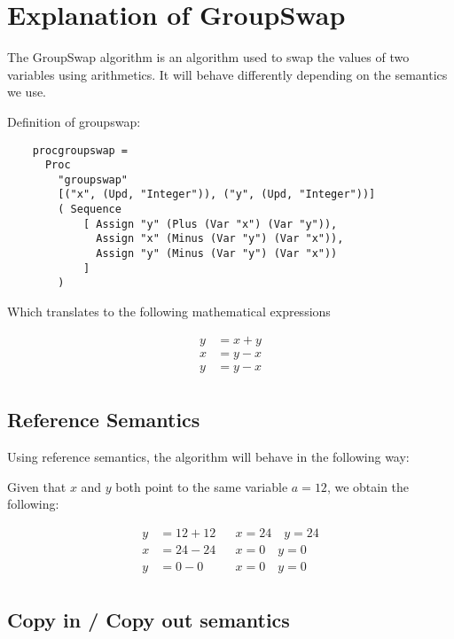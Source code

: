 \documentclass{article}
\begin{document}
    \section{Explanation of GroupSwap}

    The GroupSwap algorithm is an algorithm used to swap the values of two variables using arithmetics. It will behave differently depending on the semantics we use. 


    \begin{definition}
        Definition of groupswap: 
        \begin{lstlisting}
    procgroupswap =
      Proc
        "groupswap"
        [("x", (Upd, "Integer")), ("y", (Upd, "Integer"))]
        ( Sequence
            [ Assign "y" (Plus (Var "x") (Var "y")),
              Assign "x" (Minus (Var "y") (Var "x")),
              Assign "y" (Minus (Var "y") (Var "x"))
            ]
        )
        \end{lstlisting}

        Which translates to the following mathematical expressions

        \begin{align*}
            y &= x + y \\
            x &= y - x \\
            y &= y - x \\
        \end{align*}
    \end{definition}

    \subsection{Reference Semantics}
    Using reference semantics, the algorithm will behave in the following way:
    \medskip

    Given that \( x \) and \( y \) both point to the same variable \( a = 12 \), we obtain the following:

    \begin{align*}
        y &= 12 + 12 && x = 24 \quad y = 24 \\
        x &= 24 - 24 && x = 0 \quad y = 0 \\
        y &= 0 - 0 && x = 0 \quad y = 0\\
    \end{align*}

    \subsection{Copy in / Copy out semantics}
\end{document}
